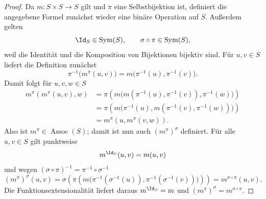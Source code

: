 \documentclass[main.tex]{subfiles}
\begin{document}
\begin{proof}
Da \(m\colon S\times S\to S\) gilt und \(\pi\) eine Selbstbijektion ist,
definiert die angegebene Formel zunächst wieder eine binäre Operation auf
\(S\).  Außerdem gelten
\[
  \Id_S\in\operatorname{Sym}(S),
  \qquad
  \sigma\circ\pi\in\operatorname{Sym}(S),
\]
weil die Identität und die Komposition von Bijektionen bijektiv sind.
Für \(u,v\in S\) liefert die Definition zunächst
\[
  \pi^{-1}\!\bigl(m^\pi(u,v)\bigr)
  =m\bigl(\pi^{-1}(u),\pi^{-1}(v)\bigr).
\]
Damit folgt für \(u,v,w\in S\)
\[
\begin{aligned}
m^\pi(m^\pi(u,v),w)
 &=\pi\!\left(
   m\bigl(m(\pi^{-1}(u),\pi^{-1}(v)),\pi^{-1}(w)\bigr)
   \right)\\
 &=\pi\!\left(
   m\bigl(\pi^{-1}(u),m(\pi^{-1}(v),\pi^{-1}(w))\bigr)
   \right)\\
 &=m^\pi(u,m^\pi(v,w)).
\end{aligned}
\]
Also ist \(m^\pi\in\operatorname{Assoc}(S)\); damit ist nun auch
\((m^\pi)^\sigma\) definiert.  Für alle \(u,v\in S\) gilt punktweise
\[
  m^{\Id_S}(u,v)=m(u,v)
\]
und wegen
\((\sigma\circ\pi)^{-1}=\pi^{-1}\circ\sigma^{-1}\)
\[
  (m^\pi)^\sigma(u,v)
  =\sigma\!\left(\pi\!\left(
      m\bigl(\pi^{-1}(\sigma^{-1}(u)),
             \pi^{-1}(\sigma^{-1}(v))\bigr)
    \right)\right)
  =m^{\sigma\circ\pi}(u,v).
\]
Die Funktionsextensionalität liefert daraus
\(m^{\Id_S}=m\) und
\((m^\pi)^\sigma=m^{\sigma\circ\pi}\).
\end{proof}

\end{document}
